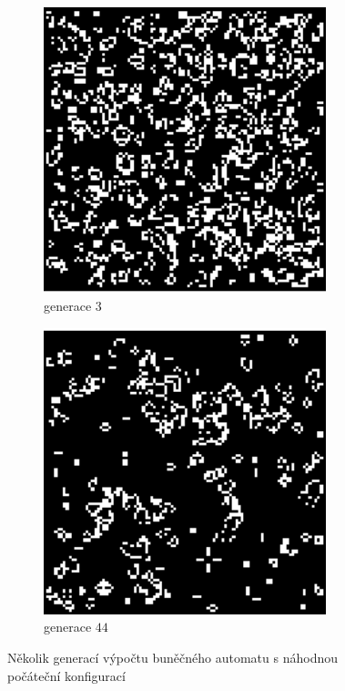 \begin{figure}
 \begin{subfigure}{0.4\textwidth}
  \includegraphics[width=0.9\textwidth]{genimg-game-of-life-3}
  \caption{generace $3$}
 \end{subfigure}%
 \begin{subfigure}{0.4\textwidth}
  \includegraphics[width=0.9\textwidth]{genimg-game-of-life-4}
  \caption{generace $44$}
 \end{subfigure}
 
 \caption[Ukázka generací výpočtu buněčného automatu]{Několik generací výpočtu buněčného automatu  s náhodnou počáteční konfigurací} \label{img:GameOfLife}
\end{figure}

